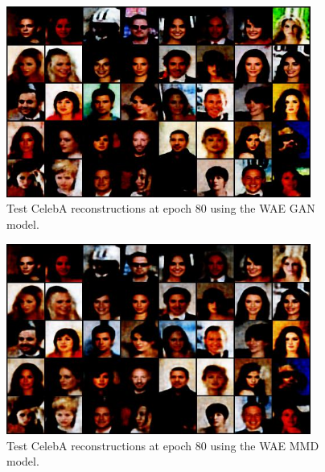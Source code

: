 \documentclass[12pt,english]{amsart}
\theoremstyle{definition}
\begin{document}
\begin{figure}[h]
\includegraphics[width=100mm]{celeb_wae-gan_ep_79_recon}
\caption{Test CelebA reconstructions at epoch 80 using the WAE GAN model.}
\label{Figure 3}
\end{figure}

\begin{figure}[h]
\includegraphics[width=100mm]{celeb_wae-mmd_ep_79_recon}
\caption{Test CelebA reconstructions at epoch 80 using the WAE MMD model.}
\label{Figure 4}
\end{figure}
\end{document}
